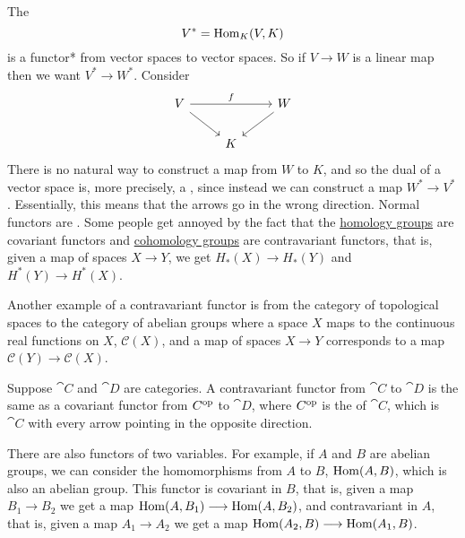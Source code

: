 \documentclass[11pt, twoside]{article}
\begin{document}
The \href{https://en.wikipedia.org/wiki/Dual_space}{}
$$
V^* = \operatorname{Hom}_K(V,K)
$$
is a functor* from vector spaces to vector spaces. So if $V\longrightarrow W$ is a linear map then we want $V^* \longrightarrow W^*$. Consider 
\[
\begin{tikzcd}
V \arrow[rr, "f"] \arrow[dr] && W\arrow[dl] \\ & K &
\end{tikzcd}
\]
There is no natural way to construct a map from $W$ to $K$, and so the dual of a vector space is, more precisely, a \href{https://en.wikipedia.org/wiki/Functor#Covariance_and_contravariance}{}, since instead we can construct a map $W^* \longrightarrow V^*$. Essentially, this means that the arrows go in the wrong direction. Normal functors are \href{https://en.wikipedia.org/wiki/Functor#Covariance_and_contravariance}{}. Some people get annoyed by the fact that the \href{https://en.wikipedia.org/wiki/Homology_(mathematics)}{\color{black}homology groups} are covariant functors and \href{https://en.wikipedia.org/wiki/Cohomology}{\color{black}cohomology groups} are contravariant functors, that is, given a map of spaces $X\longrightarrow Y$, we get $H_*(X) \longrightarrow H_*(Y)$ and $H^*(Y) \longrightarrow H^*(X)$.

Another example of a contravariant functor is from the category of topological spaces to the category of abelian groups where a space $X$ maps to the continuous real functions on $X$, $\mathscr{C}(X)$, and a map of spaces $X\longrightarrow Y$ corresponds to a map  $\mathscr{C}(Y) \longrightarrow \mathscr{C}(X)$.

Suppose $\cat C$ and $\cat D$ are categories. A contravariant functor from $\cat C$ to $\cat D$ is the same as a covariant functor from $ {\relax C}^{\textup {op}}$ to $\cat D$, where $ {\relax C}^{\textup {op}}$ is the \href{https://en.wikipedia.org/wiki/Opposite_category}{} of $\cat C$, which is $\cat C$ with every arrow pointing in the opposite direction.

There are also functors of two variables. For example, if $A$ and $B$ are abelian groups, we can consider the homomorphisms from $A$ to $B$, $\operatorname{Hom}(A,B)$, which is also an abelian group. This functor is covariant in $B$, that is, given a map $B_1 \longrightarrow B_2$ we get a map $\operatorname{Hom}(A,B_1) \longrightarrow \operatorname{Hom}(A,B_2)$, and contravariant in $A$, that is, given a map $A_1\longrightarrow A_2$ we get a map $\operatorname{Hom}(A_2,B)\longrightarrow\operatorname{Hom}(A_1,B)$.
\end{document}

